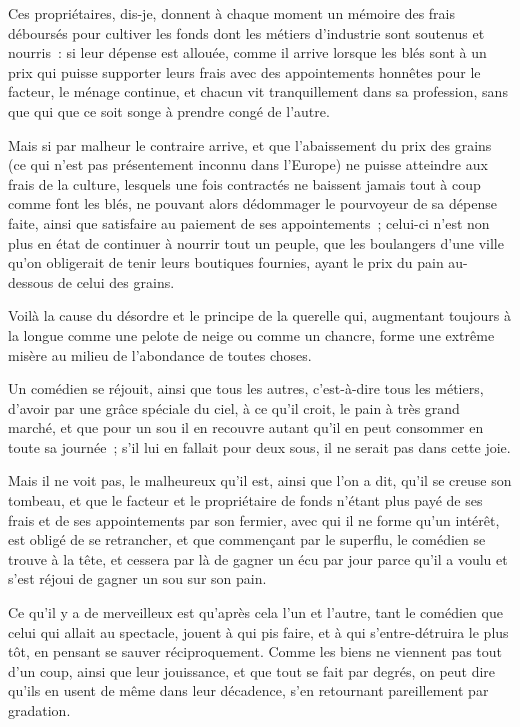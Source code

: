 \documentclass[french,twoside]{book} %
\begin{document}
Ces propriétaires, dis-je, donnent à chaque moment un mémoire des frais déboursés pour cultiver les fonds dont les métiers d’industrie sont soutenus et nourris : si leur dépense est allouée, comme il arrive lorsque les blés sont à un prix qui puisse supporter leurs frais avec des appointements honnêtes pour le facteur, le ménage continue, et chacun vit tranquillement dans sa profession, sans que qui que ce soit songe à prendre congé de l’autre.\par
Mais si par malheur le contraire arrive, et que l’abaissement du prix des grains (ce qui n’est pas présentement inconnu dans l’Europe) ne puisse atteindre aux frais de la culture, lesquels une fois contractés ne baissent jamais tout à coup comme font les blés, ne pouvant alors dédommager le pourvoyeur de sa dépense faite, ainsi que satisfaire au paiement de ses appointements ; celui-ci n’est non plus en état de continuer à nourrir tout un peuple, que les boulangers d’une ville qu’on obligerait de tenir leurs boutiques fournies, ayant le prix du pain au-dessous de celui des grains.\par
Voilà la cause du désordre et le principe de la querelle qui, augmentant toujours à la longue comme une pelote de neige ou comme un chancre, forme une extrême misère au milieu de l’abondance de toutes choses.\par
Un comédien se réjouit, ainsi que tous les autres, c’est-à-dire tous les métiers, d’avoir par une grâce spéciale du ciel, à ce qu’il croit, le pain à très grand marché, et que pour un sou il en recouvre autant qu’il en peut consommer en toute sa journée ; s’il lui en fallait pour deux sous, il ne serait pas dans cette joie.\par
Mais il ne voit pas, le malheureux qu’il est, ainsi que l’on a dit, qu’il se creuse son tombeau, et que le facteur et le propriétaire de fonds n’étant plus payé de ses frais et de ses appointements par son fermier, avec qui il ne forme qu’un intérêt, est obligé de se retrancher, et que commençant par le superflu, le comédien se trouve à la tête, et cessera par là de gagner un écu par jour parce qu’il a voulu et s’est réjoui de gagner un sou sur son pain.\par
Ce qu’il y a de merveilleux est qu’après cela l’un et l’autre, tant le comédien que celui qui allait au spectacle, jouent à qui pis faire, et à qui s’entre-détruira le plus tôt, en pensant se sauver réciproquement. Comme les biens ne viennent pas tout d’un coup, ainsi que leur jouissance, et que tout se fait par degrés, on peut dire qu’ils en usent de même dans leur décadence, s’en retournant pareillement par gradation.\par
\end{document}
